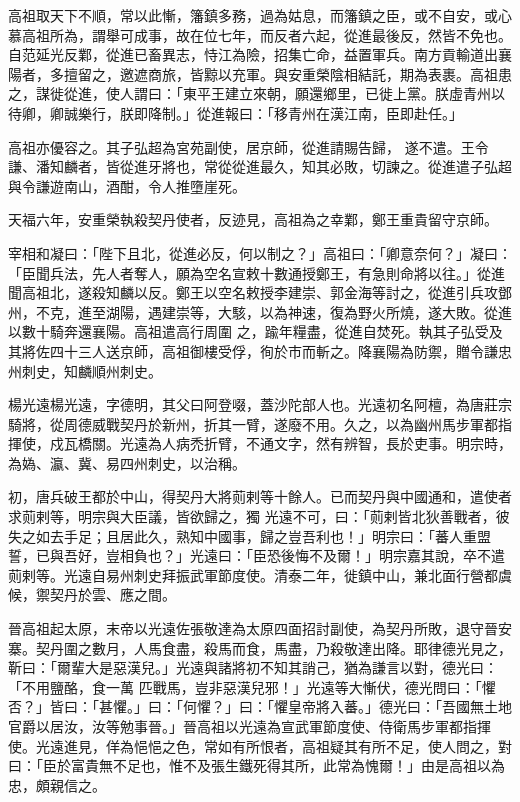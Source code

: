 \begin{pinyinscope}
 高祖取天下不順，常以此慚，籓鎮多務，過為姑息，而籓鎮之臣，或不自安，或心慕高祖所為，謂舉可成事，故在位七年，而反者六起，從進最後反，然皆不免也。自范延光反鄴，從進已畜異志，恃江為險，招集亡命，益置軍兵。南方貢輸道出襄陽者，多擅留之，邀遮商旅，皆黥以充軍。與安重榮陰相結託，期為表裹。高祖患之，謀徙從進，使人謂曰：「東平王建立來朝，願還鄉里，已徙上黨。朕虛青州以待卿，卿誠樂行，朕即降制。」從進報曰：「移青州在漢江南，臣即赴任。」



 高祖亦優容之。其子弘超為宮苑副使，居京師，從進請賜告歸，
 遂不遣。王令謙、潘知麟者，皆從進牙將也，常從從進最久，知其必敗，切諫之。從進遣子弘超與令謙遊南山，酒酣，令人推墮崖死。



 天福六年，安重榮執殺契丹使者，反迹見，高祖為之幸鄴，鄭王重貴留守京師。



 宰相和凝曰：「陛下且北，從進必反，何以制之？」高祖曰：「卿意奈何？」凝曰：「臣聞兵法，先人者奪人，願為空名宣敕十數通授鄭王，有急則命將以往。」從進聞高祖北，遂殺知麟以反。鄭王以空名敕授李建崇、郭金海等討之，從進引兵攻鄧州，不克，進至湖陽，遇建崇等，大駭，以為神速，復為野火所燒，遂大敗。從進以數十騎奔還襄陽。高祖遣高行周圍
 之，踰年糧盡，從進自焚死。執其子弘受及其將佐四十三人送京師，高祖御樓受俘，徇於市而斬之。降襄陽為防禦，贈令謙忠州刺史，知麟順州刺史。



 楊光遠楊光遠，字德明，其父曰阿登啜，蓋沙陀部人也。光遠初名阿檀，為唐莊宗騎將，從周德威戰契丹於新州，折其一臂，遂廢不用。久之，以為幽州馬步軍都指揮使，戍瓦橋關。光遠為人病禿折臂，不通文字，然有辨智，長於吏事。明宗時，為媯、瀛、冀、易四州刺史，以治稱。



 初，唐兵破王都於中山，得契丹大將荝剌等十餘人。已而契丹與中國通和，遣使者求荝剌等，明宗與大臣議，皆欲歸之，獨
 光遠不可，曰：「荝剌皆北狄善戰者，彼失之如去手足；且居此久，熟知中國事，歸之豈吾利也！」明宗曰：「蕃人重盟誓，已與吾好，豈相負也？」光遠曰：「臣恐後悔不及爾！」明宗嘉其說，卒不遣荝剌等。光遠自易州刺史拜振武軍節度使。清泰二年，徙鎮中山，兼北面行營都虞候，禦契丹於雲、應之間。



 晉高祖起太原，末帝以光遠佐張敬達為太原四面招討副使，為契丹所敗，退守晉安寨。契丹圍之數月，人馬食盡，殺馬而食，馬盡，乃殺敬達出降。耶律德光見之，靳曰：「爾輩大是惡漢兒。」光遠與諸將初不知其誚己，猶為謙言以對，德光曰：「不用鹽酪，食一萬
 匹戰馬，豈非惡漢兒邪！」光遠等大慚伏，德光問曰：「懼否？」皆曰：「甚懼。」曰：「何懼？」曰：「懼皇帝將入蕃。」德光曰：「吾國無土地官爵以居汝，汝等勉事晉。」晉高祖以光遠為宣武軍節度使、侍衛馬步軍都指揮使。光遠進見，佯為悒悒之色，常如有所恨者，高祖疑其有所不足，使人問之，對曰：「臣於富貴無不足也，惟不及張生鐵死得其所，此常為愧爾！」由是高祖以為忠，頗親信之。




\end{pinyinscope}
